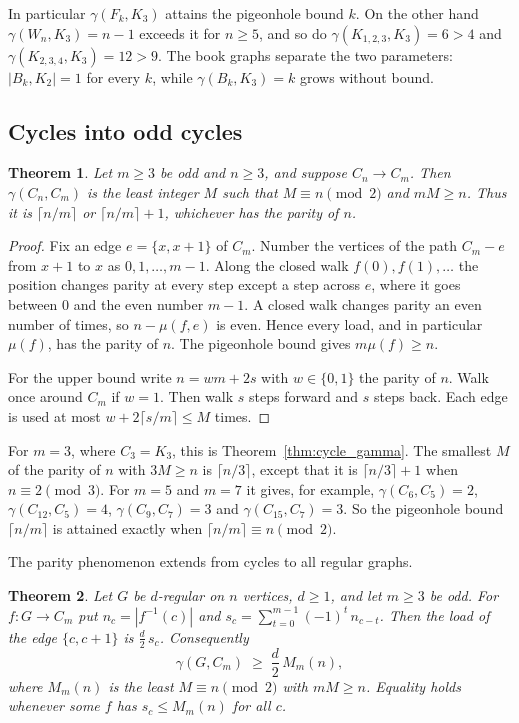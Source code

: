 \documentclass{article}
\newtheorem{theorem}{Theorem}[section]
\theoremstyle{definition}
\begin{document}
In particular $\gamma(F_k,K_3)$ attains the pigeonhole bound $k$.  On the other
hand $\gamma(W_n,K_3)=n-1$ exceeds it for $n\ge5$, and so do
$\gamma(K_{1,2,3},K_3)=6>4$ and $\gamma(K_{2,3,4},K_3)=12>9$.  The book graphs
separate the two parameters: $|B_k,K_2|=1$ for every $k$, while
$\gamma(B_k,K_3)=k$ grows without bound.

\subsection{Cycles into odd cycles}

\begin{theorem}
\label{thm:cycle_cycle}
Let $m\ge3$ be odd and $n\ge3$, and suppose $C_n\to C_m$.  Then $\gamma(C_n,C_m)$
is the least integer $M$ such that $M\equiv n\pmod 2$ and $mM\ge n$.  Thus it is
$\lceil n/m\rceil$ or $\lceil n/m\rceil+1$, whichever has the parity of $n$.
\end{theorem}

\begin{proof}
Fix an edge $e=\{x,x+1\}$ of $C_m$.  Number the vertices of the path $C_m-e$ from
$x+1$ to $x$ as $0,1,\dots,m-1$.  Along the closed walk $f(0),f(1),\dots$ the
position changes parity at every step except a step across $e$, where it goes
between $0$ and the even number $m-1$.  A closed walk changes parity an even
number of times, so $n-\mu(f,e)$ is even.  Hence every load, and in particular
$\mu(f)$, has the parity of $n$.  The pigeonhole bound gives $m\mu(f)\ge n$.

For the upper bound write $n=wm+2s$ with $w\in\{0,1\}$ the parity of $n$.  Walk
once around $C_m$ if $w=1$.  Then walk $s$ steps forward and $s$ steps back.  Each
edge is used at most $w+2\lceil s/m\rceil\le M$ times.
\end{proof}

For $m=3$, where $C_3=K_3$, this is Theorem~\ref{thm:cycle_gamma}.  The smallest
$M$ of the parity of $n$ with $3M\ge n$ is $\lceil n/3\rceil$, except that it is
$\lceil n/3\rceil+1$ when $n\equiv2\pmod 3$.  For $m=5$ and $m=7$ it gives, for
example, $\gamma(C_6,C_5)=2$, $\gamma(C_{12},C_5)=4$, $\gamma(C_9,C_7)=3$ and
$\gamma(C_{15},C_7)=3$.  So the pigeonhole bound $\lceil n/m\rceil$ is attained
exactly when $\lceil n/m\rceil\equiv n\pmod 2$.

The parity phenomenon extends from cycles to all regular graphs.

\begin{theorem}
\label{thm:regular_oddcycle}
Let $G$ be $d$-regular on $n$ vertices, $d\ge1$, and let $m\ge3$ be odd.  For
$f\colon G\to C_m$ put $n_c=|f^{-1}(c)|$ and
$s_c=\sum_{t=0}^{m-1}(-1)^t\,n_{c-t}$.  Then the load of the edge $\{c,c+1\}$ is
$\frac d2\,s_c$.  Consequently
\[
  \gamma(G,C_m)\;\ge\;\frac d2\,M_m(n),
\]
where $M_m(n)$ is the least $M\equiv n\pmod 2$ with $mM\ge n$.  Equality holds
whenever some $f$ has $s_c\le M_m(n)$ for all $c$.
\end{theorem}
\end{document}
